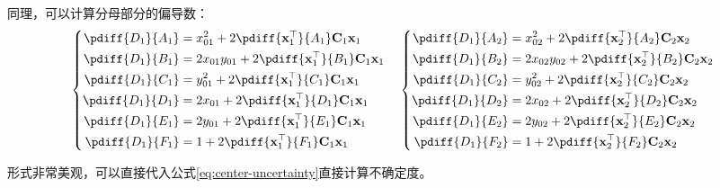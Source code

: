\documentclass{article}
\begin{document}
同理，可以计算分母部分的偏导数：
\begin{align*}
  \left\{\begin{aligned}
    \pdiff{D_1}{A_1}&=x_{01}^2+2\pdiff{\mathbf{x}_1^\top}{A_1}\mathbf{C}_1\mathbf{x}_1\\
    \pdiff{D_1}{B_1}&=2x_{01}y_{01}+2\pdiff{\mathbf{x}_1^\top}{B_1}\mathbf{C}_1\mathbf{x}_1\\
    \pdiff{D_1}{C_1}&=y_{01}^2+2\pdiff{\mathbf{x}_1^\top}{C_1}\mathbf{C}_1\mathbf{x}_1\\
    \pdiff{D_1}{D_1}&=2x_{01}+2\pdiff{\mathbf{x}_1^\top}{D_1}\mathbf{C}_1\mathbf{x}_1\\
    \pdiff{D_1}{E_1}&=2y_{01}+2\pdiff{\mathbf{x}_1^\top}{E_1}\mathbf{C}_1\mathbf{x}_1\\
    \pdiff{D_1}{F_1}&=1+2\pdiff{\mathbf{x}_1^\top}{F_1}\mathbf{C}_1\mathbf{x}_1
  \end{aligned}\right.\quad \left\{\begin{aligned}
    \pdiff{D_1}{A_2}&=x_{02}^2+2\pdiff{\mathbf{x}_2^\top}{A_2}\mathbf{C}_2\mathbf{x}_2\\
    \pdiff{D_1}{B_2}&=2x_{02}y_{02}+2\pdiff{\mathbf{x}_2^\top}{B_2}\mathbf{C}_2\mathbf{x}_2\\
    \pdiff{D_1}{C_2}&=y_{02}^2+2\pdiff{\mathbf{x}_2^\top}{C_2}\mathbf{C}_2\mathbf{x}_2\\
    \pdiff{D_1}{D_2}&=2x_{02}+2\pdiff{\mathbf{x}_2^\top}{D_2}\mathbf{C}_2\mathbf{x}_2\\
    \pdiff{D_1}{E_2}&=2y_{02}+2\pdiff{\mathbf{x}_2^\top}{E_2}\mathbf{C}_2\mathbf{x}_2\\
    \pdiff{D_1}{F_2}&=1+2\pdiff{\mathbf{x}_2^\top}{F_2}\mathbf{C}_2\mathbf{x}_2
  \end{aligned}\right.
\end{align*}\par
形式非常美观，可以直接代入公式\ref{eq:center-uncertainty}直接计算不确定度。
\newpage
\printbibliography[heading=bibliography,title=参考文献]
\end{document}
